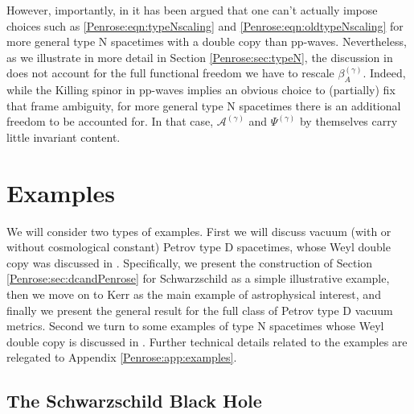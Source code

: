 However, importantly, in \cite{Godazgar:2020zbv} it has been argued that one can't actually impose choices such as \eqref{Penrose:eqn:typeNscaling} and \eqref{Penrose:eqn:oldtypeNscaling} for more general type N spacetimes with a double copy than pp-waves. Nevertheless, as we illustrate in more detail in Section \ref{Penrose:sec:typeN}, the discussion in \cite{Godazgar:2020zbv} does not account for the full functional freedom we have to rescale $\beta_A^{(\gamma)}$. Indeed, while the Killing spinor in pp-waves implies an obvious choice to (partially) fix that frame ambiguity, for more general type N spacetimes there is an additional freedom to be accounted for. In that case, $\mathcal{A}^{(\gamma)}$ and $\Psi^{(\gamma)}$ by themselves carry little invariant content.

\section{Examples} \label{Penrose:sec:examples}

We will consider two types of examples. First we will discuss vacuum (with or without cosmological constant) Petrov type D spacetimes, whose Weyl double copy was discussed in \cite{Luna:2018dpt}. Specifically, we present the construction of Section \ref{Penrose:sec:dcandPenrose} for Schwarzschild as a simple illustrative example, then we move on to Kerr as the main example of astrophysical interest, and finally we present the general result for the full class of Petrov type D vacuum metrics. Second we turn to some examples of type N spacetimes whose Weyl double copy is discussed in \cite{Godazgar:2020zbv}. Further technical details related to the examples are relegated to Appendix \ref{Penrose:app:examples}.

\subsection{The Schwarzschild Black Hole}\label{Penrose:sec:Schwarzschild}

